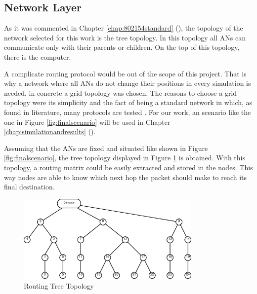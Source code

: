 \subsection{Network Layer}

As it was commented in Chapter \ref{chap:802154standard} (), the topology of the network selected for this work
is the tree topology. In this topology all \acp{AN} can communicate only with their parents or children. On the top of this topology, there is 
the computer.

A complicate routing protocol would be out of the scope of this project. That is why a network where all \acp{AN} do not change their positions 
in every simulation is needed, in concrete a grid topology was chosen. The reasons to choose a grid topology were its simplicity and the fact of 
being a standard network in which, as found in literature, many protocols are tested \cite{GridNetworks}. For our work, an scenario like the one 
in Figure \ref{fig:finalscenario} will be used in Chapter \ref{chap:simulationandresults} ().

Assuming that the \acp{AN} are fixed and situated like shown in Figure \ref{fig:finalscenario}, the tree topology displayed in Figure 
\ref{fig:routetree} is obtained. With this topology, a routing matrix could be easily extracted and stored in the nodes. This way nodes 
are able to know which next hop the packet should make to reach its final destination.

\begin{figure}[ht]
 \begin{center}
  \includegraphics[width=0.8\textwidth]{routetree.eps}
 \end{center}
 \caption{Routing Tree Topology}
 \label{fig:routetree}
\end{figure}

